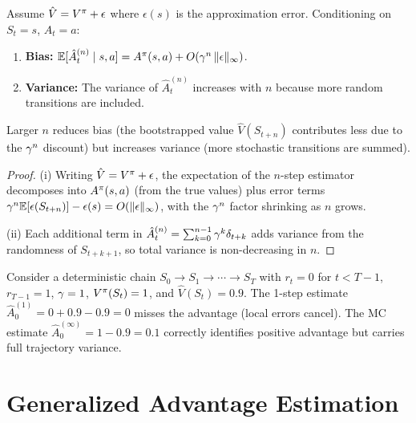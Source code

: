 \documentclass[11pt,a4paper]{article}
\begin{document}
\begin{theorem}
\label{thm:n-step-bias-var}
Assume $\hat{V} = V^{\pi} + \epsilon$ where $\epsilon(s)$ is the
approximation error. Conditioning on $S_t = s$, $A_t = a$:
\begin{enumerate}[label=(\roman*)]
  \item \textbf{Bias:}
    $\mathbb{E}[\hat{A}_t^{(n)} \mid s, a] = A^\pi(s,a) + O(\gamma^n\,
    \|\epsilon\|_\infty)$.
  \item \textbf{Variance:} The variance of $\hat{A}_t^{(n)}$ increases
    with $n$ because more random transitions are included.
\end{enumerate}
Larger $n$ reduces bias (the bootstrapped value $\hat{V}(S_{t+n})$
contributes less due to the $\gamma^n$ discount) but increases
variance (more stochastic transitions are summed).
\end{theorem}

\begin{proof}
(i) Writing $\hat{V} = V^{\pi} + \epsilon$, the expectation of the
$n$-step estimator decomposes into $A^\pi(s,a)$ (from the true
values) plus error terms $\gamma^n \mathbb{E}[\epsilon(S_{t+n})] -
\epsilon(s) = O(\|\epsilon\|_\infty)$, with the $\gamma^n$ factor
shrinking as $n$ grows.

(ii) Each additional term in $\hat{A}_t^{(n)} = \sum_{k=0}^{n-1}
\gamma^k \delta_{t+k}$ adds variance from the randomness of
$S_{t+k+1}$, so total variance is non-decreasing in $n$.
\end{proof}

\begin{example}
\label{ex:chain-mdp}
Consider a deterministic chain $S_0 \to S_1 \to \cdots \to S_T$ with
$r_t = 0$ for $t < T-1$, $r_{T-1} = 1$, $\gamma = 1$, $V^{\pi}(S_t) = 1$,
and $\hat{V}(S_t) = 0.9$. The 1-step estimate $\hat{A}_0^{(1)} =
0 + 0.9 - 0.9 = 0$ misses the advantage (local errors cancel). The MC
estimate $\hat{A}_0^{(\infty)} = 1 - 0.9 = 0.1$ correctly identifies
positive advantage but carries full trajectory variance.
\end{example}

\section{Generalized Advantage Estimation}
\end{document}
